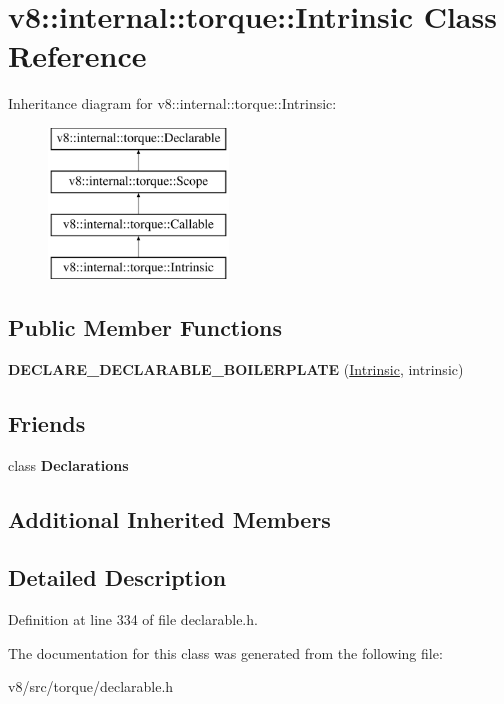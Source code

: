 \hypertarget{classv8_1_1internal_1_1torque_1_1Intrinsic}{}\section{v8\+:\+:internal\+:\+:torque\+:\+:Intrinsic Class Reference}
\label{classv8_1_1internal_1_1torque_1_1Intrinsic}
Inheritance diagram for v8\+:\+:internal\+:\+:torque\+:\+:Intrinsic\+:\begin{figure}[H]
\begin{center}
\leavevmode
\includegraphics[height=4.000000cm]{classv8_1_1internal_1_1torque_1_1Intrinsic}
\end{center}
\end{figure}
\subsection*{Public Member Functions}
\begin{DoxyCompactItemize}
\item 
\mbox{\label{classv8_1_1internal_1_1torque_1_1Intrinsic_a304b9b40d484a6cdcabf80a3b83d1989}} 
{\bfseries D\+E\+C\+L\+A\+R\+E\+\_\+\+D\+E\+C\+L\+A\+R\+A\+B\+L\+E\+\_\+\+B\+O\+I\+L\+E\+R\+P\+L\+A\+TE} (\mbox{\hyperlink{classv8_1_1internal_1_1torque_1_1Intrinsic}{Intrinsic}}, intrinsic)
\end{DoxyCompactItemize}
\subsection*{Friends}
\begin{DoxyCompactItemize}
\item 
\mbox{\label{classv8_1_1internal_1_1torque_1_1Intrinsic_a23135931a5f054329315374b774718cf}} 
class {\bfseries Declarations}
\end{DoxyCompactItemize}
\subsection*{Additional Inherited Members}


\subsection{Detailed Description}


Definition at line 334 of file declarable.\+h.



The documentation for this class was generated from the following file\+:\begin{DoxyCompactItemize}
\item 
v8/src/torque/declarable.\+h\end{DoxyCompactItemize}
